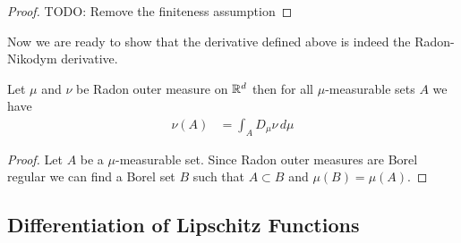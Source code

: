 \begin{proof}
TODO: Remove the finiteness assumption
\end{proof}

Now we are ready to show that the derivative defined above is indeed the Radon-Nikodym derivative.
\begin{thm}\label{RadonNikodymDerivativeOfRadonOuterMeasuresReals}Let $\mu$ and $\nu$ be Radon outer measure on $\mathbb{R}^d$ then for all $\mu$-measurable sets $A$ we have
\begin{align*}
\nu(A) &= \int_A D_\mu \nu \, d\mu
\end{align*}
\end{thm}
\begin{proof}
Let $A$ be a $\mu$-measurable set.  Since Radon outer measures are Borel regular we can find a Borel set $B$ such that $A \subset B$ and $\mu(B) = \mu(A)$.
\end{proof}
\subsection{Differentiation of Lipschitz Functions}

